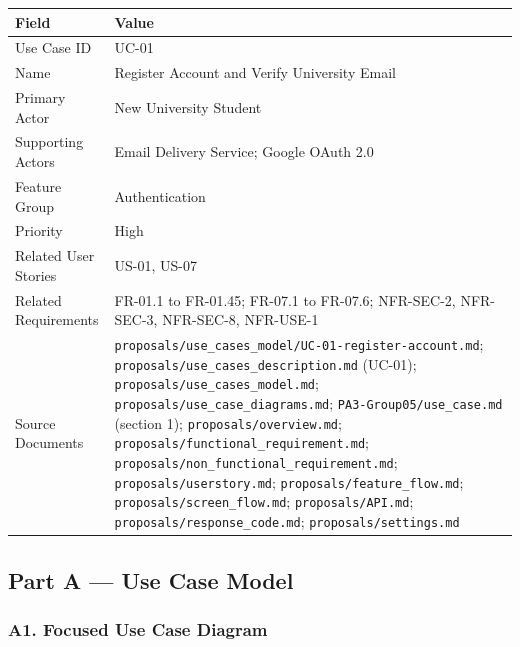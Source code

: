 \documentclass[12pt]{article}
\renewcommand{\baselinestretch}{1.5}
\begin{document}
\begingroup
\small
\renewcommand{\baselinestretch}{1.0}\selectfont
\renewcommand{\arraystretch}{1.15}
\setlength{\tabcolsep}{6pt}
\begin{longtable}{|>{\raggedright\arraybackslash}p{}|>{\raggedright\arraybackslash}p{}|}
\hline
\textbf{Field} & \textbf{Value} \\ \hline
\endhead
Use Case ID & UC-01 \\ \hline
Name & Register Account and Verify University Email \\ \hline
Primary Actor & New University Student \\ \hline
Supporting Actors & Email Delivery Service; Google OAuth 2.0 \\ \hline
Feature Group & Authentication \\ \hline
Priority & High \\ \hline
Related User Stories & US-01, US-07 \\ \hline
Related Requirements & FR-01.1 to FR-01.45; FR-07.1 to FR-07.6; NFR-SEC-2, NFR-SEC-3, NFR-SEC-8, NFR-USE-1 \\ \hline
Source Documents & \texttt{proposals/use\_cases\_model/UC-01-register-account.md}; \texttt{proposals/use\_cases\_description.md} (UC-01); \texttt{proposals/use\_cases\_model.md}; \texttt{proposals/use\_case\_diagrams.md}; \texttt{PA3-Group05/use\_case.md} (section 1); \texttt{proposals/overview.md}; \texttt{proposals/functional\_requirement.md}; \texttt{proposals/non\_functional\_requirement.md}; \texttt{proposals/userstory.md}; \texttt{proposals/feature\_flow.md}; \texttt{proposals/screen\_flow.md}; \texttt{proposals/API.md}; \texttt{proposals/response\_code.md}; \texttt{proposals/settings.md} \\ \hline
\end{longtable}
\endgroup
\par\medskip

\hypertarget{sec:part-a-use-case-model}{}
\subsection*{Part A --- Use Case Model}
\par\medskip

\hypertarget{sec:a1-focused-use-case-diagram}{}
\subsubsection*{A1. Focused Use Case Diagram}
\par\medskip
\end{document}

